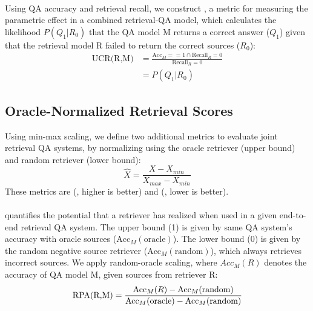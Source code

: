 


\paragraph{\UCR}
Using QA accuracy and retrieval recall, we construct \UCR, a metric for measuring the parametric effect in a combined retrieval-QA model, which calculates the likelihood $P(Q_1|R_0)$ that the QA model M returns a correct answer ($Q_1$) given that the retrieval model R failed to return the correct sources ($R_0$):
\begin{equation}
\label{eq:UCR}
\begin{aligned}
\text{UCR(R,M)} &= \frac{\text{Acc}_M == 1 \cap   \text{Recall}_R = 0}{\text{Recall}_R = 0}\\
&= P(Q_1|R_0) 
\end{aligned}
\end{equation}

\subsection{Oracle-Normalized Retrieval Scores}
Using min-max scaling, we define two additional metrics to evaluate joint retrieval QA systems, by normalizing using the oracle retriever (upper bound) and random retriever (lower bound):
\begin{equation}
\hat{X} = \frac{X - X_{min}}{X_{max} - X_{min}}
\end{equation}
These metrics are \rpa (\RPA, higher is better) and \ppr (\PPR, lower is better).

\paragraph{\rpa}
\RPA quantifies the potential that a retriever has realized when used in a given end-to-end retrieval QA system. The upper bound (1) is given by same QA system's accuracy with oracle sources ($\text{Acc}_M(\text{oracle})$). The lower bound (0) is given by the random negative source retriever ($\text{Acc}_M(\text{random})$), which always retrieves incorrect sources. We apply random-oracle scaling, where $Acc_M(R)$ denotes the accuracy of QA model M, given sources from retriever R: 
\begin{equation}
\label{eq:RPA}
\text{RPA}(\text{R,M}) = \frac{\text{Acc}_M(R) - \text{Acc}_M(\text{random})}{\text{Acc}_M(\text{oracle}) - \text{Acc}_M(\text{random})}
\end{equation}

